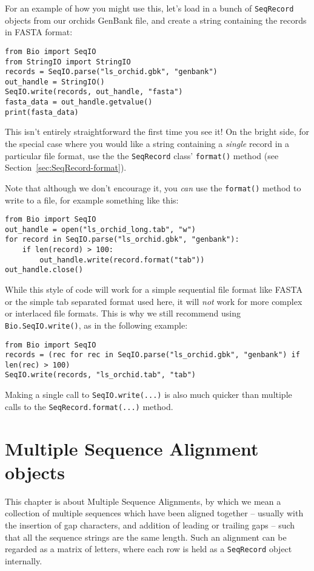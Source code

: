 \documentclass{report}
\begin{document}
For an example of how you might use this, let's load in a bunch of \verb|SeqRecord| objects from our orchids GenBank file, and create a string containing the records in FASTA format:

\begin{verbatim}
from Bio import SeqIO
from StringIO import StringIO
records = SeqIO.parse("ls_orchid.gbk", "genbank")
out_handle = StringIO()
SeqIO.write(records, out_handle, "fasta")
fasta_data = out_handle.getvalue()
print(fasta_data)
\end{verbatim}

This isn't entirely straightforward the first time you see it!  On the bright side, for the special case where you would like a string containing a \emph{single} record in a particular file format, use the the \verb|SeqRecord| class' \verb|format()| method (see Section~\ref{sec:SeqRecord-format}).

Note that although we don't encourage it, you \emph{can} use the \verb|format()| method to write to a file, for example something like this:
\begin{verbatim}
from Bio import SeqIO
out_handle = open("ls_orchid_long.tab", "w")
for record in SeqIO.parse("ls_orchid.gbk", "genbank"):
    if len(record) > 100:
        out_handle.write(record.format("tab"))
out_handle.close()
\end{verbatim}
\noindent While this style of code will work for a simple sequential file format like FASTA or the simple tab separated format used here, it will \emph{not} work for more complex or interlaced file formats.  This is why we still recommend using \verb|Bio.SeqIO.write()|, as in the following example:
\begin{verbatim}
from Bio import SeqIO
records = (rec for rec in SeqIO.parse("ls_orchid.gbk", "genbank") if len(rec) > 100)
SeqIO.write(records, "ls_orchid.tab", "tab")
\end{verbatim}
\noindent Making a single call to \verb|SeqIO.write(...)| is also much quicker than
multiple calls to the \verb|SeqRecord.format(...)| method.

\chapter{Multiple Sequence Alignment objects}
\label{chapter:Bio.AlignIO}

This chapter is about Multiple Sequence Alignments, by which we mean a collection of
multiple sequences which have been aligned together -- usually with the insertion of gap
characters, and addition of leading or trailing gaps -- such that all the sequence
strings are the same length. Such an alignment can be regarded as a matrix of letters,
where each row is held as a \verb|SeqRecord| object internally.
\end{document}
